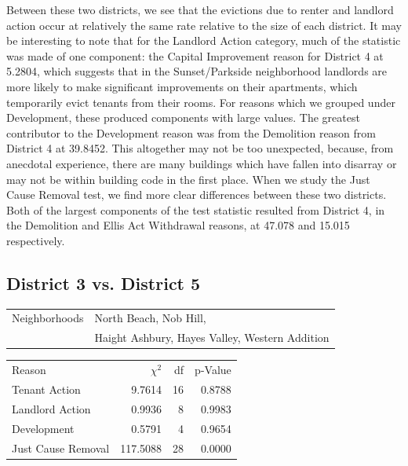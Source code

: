 \documentclass[]{article}
\begin{document}
Between these two districts, we see that the evictions due to renter and landlord action occur at relatively the same rate relative to the size of each district. It may be interesting to note that for the Landlord Action category, much of the statistic was made of one component: the Capital Improvement reason for District 4 at 5.2804, which suggests that in the Sunset/Parkside neighborhood landlords are more likely to make significant improvements on their apartments, which temporarily evict tenants from their rooms.
\newline\newline
For reasons which we grouped under Development, these produced components with large values. The greatest contributor to the Development reason was from the Demolition reason from District 4 at 39.8452. This altogether may not be too unexpected, because, from anecdotal experience, there are many buildings which have fallen into disarray or may not be within building code in the first place.
\newline\newline
When we study the Just Cause Removal test, we find more clear differences between these two districts. Both of the largest components of the test statistic resulted from District 4, in the Demolition and Ellis Act Withdrawal reasons, at 47.078 and 15.015 respectively. 

\subsection{District 3 vs. District 5}
\begin{table}[!h]
\centering
\begin{tabular}{l | l}
Neighborhoods &  North Beach, Nob Hill,  \\ 
			  &  Haight Ashbury, Hayes Valley, Western Addition \\
\end{tabular}
\end{table}

\begin {table}[!h]
\centering
\begin{tabular}{l | r | r | r}	
Reason				 &  $\chi ^{2}$ & df    & p-Value   \\
Tenant Action 		 &  9.7614      & 16    & 0.8788    \\
Landlord Action	     &  0.9936      & 8     & 0.9983    \\
Development			 &  0.5791      & 4     & 0.9654    \\
Just Cause Removal	 &  117.5088    & 28    & 0.0000    \\
\end{tabular} \newline
\end{table}
\end{document}
